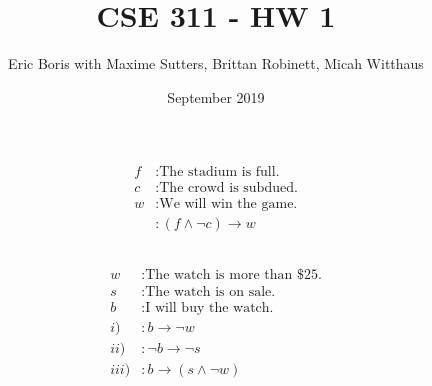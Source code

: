 \documentclass[11pt]{article}
\title{CSE 311 - HW 1}
\author{Eric Boris \newline with Maxime Sutters, Brittan Robinett, Micah Witthaus}
\date{September 2019}
\makeatletter
\renewcommand{\maketitle}{\bgroup\setlength{\parindent}{0pt}
\begin{flushleft}
  \textbf{\@title}

  \@author
  
  \@date
\end{flushleft}\egroup
}
\makeatother
\begin{document}
\maketitle

\section{} %
\subsection{} %
\begin{align*}
	f &: \text{The stadium is full.} \\
	c &: \text{The crowd is subdued.} \\
	w &: \text{We will win the game.} \\
	&: (f \land \neg{c}) \rightarrow w
\end{align*}
	

\subsection{} %
\begin{align*}
	w &: \text{The watch is more than \$25.} \\
	s &: \text{The watch is on sale.} \\
	b &: \text{I will buy the watch.} \\
	i) &: b \rightarrow \neg{w}    \\
	ii) &: \neg{b} \rightarrow \neg{s} \\
	iii) &: b \rightarrow(s \land \neg{w})
\end{align*}
\end{document}
